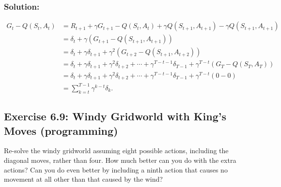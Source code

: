 \subsubsection*{Solution:}

\begin{align*}
    G_t - Q(S_t, A_t) &= R_{t+1} + \gamma G_{t+1} - Q(S_t, A_t) + \gamma Q(S_{t+1}, A_{t+1}) - \gamma Q(S_{t+1}, A_{t+1}) \\
    &= \delta_t + \gamma (G_{t+1} - Q(S_{t+1}, A_{t+1})) \\
    &= \delta_t + \gamma \delta_{t+1} + \gamma^2 (G_{t+2} - Q(S_{t+1}, A_{t+2})) \\
    &= \delta_t + \gamma \delta_{t+1} + \gamma^2 \delta_{t+2} + \cdots + \gamma^{T-t-1} \delta_{T-1} + \gamma^{T-t} (G_T - Q(S_{T}, A_{T})) \\
    &= \delta_t + \gamma \delta_{t+1} + \gamma^2 \delta_{t+2} + \cdots + \gamma^{T-t-1} \delta_{T-1} + \gamma^{T-t} (0 - 0) \\
    &= \sum_{k=t}^{T-1} \gamma^{k-t} \delta_k.
\end{align*}


\subsection*{Exercise 6.9: Windy Gridworld with King's Moves (programming)}
Re-solve the windy gridworld assuming eight possible actions, including the diagonal moves, rather than four.
How much better can you do with the extra actions? Can you do even better by including
a ninth action that causes no movement at all other than that caused by the wind?

